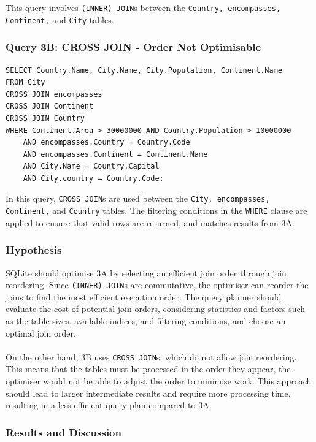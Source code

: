 \documentclass[11pt]{article}
\begin{document}
\noindent This query involves \texttt{(INNER) JOIN}s between the \texttt{Country, encompasses, Continent,} and \texttt{City} tables.

\subsubsection{Query 3B: CROSS JOIN - Order Not Optimisable}

\begin{verbatim}
SELECT Country.Name, City.Name, City.Population, Continent.Name
FROM City
CROSS JOIN encompasses
CROSS JOIN Continent
CROSS JOIN Country
WHERE Continent.Area > 30000000 AND Country.Population > 10000000
    AND encompasses.Country = Country.Code
    AND encompasses.Continent = Continent.Name
    AND City.Name = Country.Capital
    AND City.country = Country.Code;
\end{verbatim}

\noindent In this query, \texttt{CROSS JOIN}s are used between the \texttt{City, encompasses, Continent,} and \texttt{Country} tables. The filtering conditions in the
\texttt{WHERE} clause are applied to ensure that valid rows are returned, and matches results from 3A.

\subsubsection{Hypothesis}

SQLite should optimise 3A by selecting an efficient join order through join reordering. Since \texttt{(INNER) JOIN}s are commutative, the
optimiser can reorder the joins to find the most efficient execution order. The query planner should evaluate the cost of
potential join orders, considering statistics and factors such as the table sizes, available indices, and filtering conditions, and choose an optimal join order.
\\ \\
On the other hand, 3B uses \texttt{CROSS JOIN}s, which do not allow join reordering. This means that the tables must be processed in the order they appear,
the optimiser would not be able to adjust the order to minimise work. This approach should lead to larger intermediate results and require
more processing time, resulting in a less efficient query plan compared to 3A.

\subsubsection{Results and Discussion}
\end{document}
